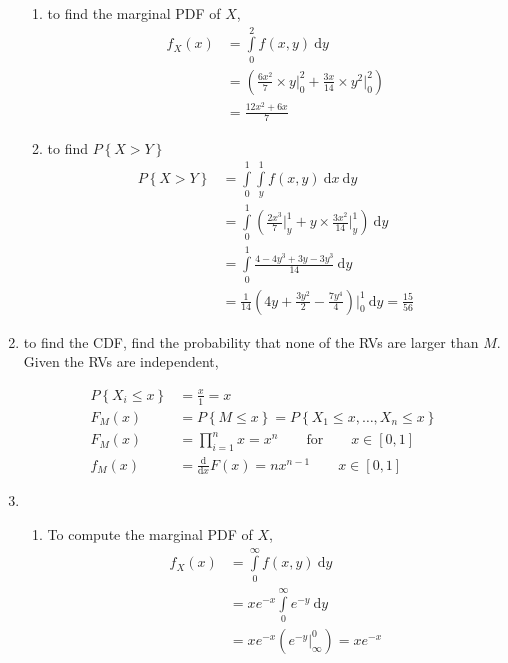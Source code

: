 \begin{enumerate}
\begin{enumerate}
			\item to find the marginal PDF of $ X $,
			\begin{align}
				f_X (x) &= \int\limits_{0}^{2} f(x, y)\ \mathrm{d}y \nonumber \\
				&= \left( \frac{6x^2}{7} \times y \Big|_0^2 + \frac{3x}{14} \times y^2 \Big|_0^2  \right) \nonumber \\
				&= \frac{12x^2 + 6x}{7}
			\end{align}
			
			\item to find $ P \left\{ X > Y \right\} $\\
			
			\begin{align}
				P\left\{ X > Y\right\} &= \int\limits_{0}^{1} \int\limits_{y}^{1} f(x, y)\ \mathrm{d}x \ \mathrm{d}y \nonumber \\
				&= \int\limits_{0}^{1} \left(\frac{2x^3}{7} \Big|_y^1 + y \times \frac{3x^2}{14} \Big|_y^1  \right) \ \mathrm{d}y  \nonumber \\
				&= \int\limits_{0}^{1} \frac{4 - 4y^3 + 3y - 3y^3}{14} \ \mathrm{d}y  \nonumber \\
				&= \frac{1}{14} \left( 4y + \frac{3y^2}{2} - \frac{7y^4}{4} \right)\Big|_0^1 \ \mathrm{d}y  = \frac{15}{56}
			\end{align}
			
		
	\end{enumerate}
	
	\item to find the CDF, find the probability that none of the RVs are larger than $ M $. Given the RVs are independent,
	
	
		\begin{align}
			P\left\{X_i \leq x \right\} &= \frac{x}{1} = x \nonumber \\
			F_M (x) &= P\left\{M \leq x\right\} = P\left\{X_1 \leq x, \dots , X_n \leq x\right\} \nonumber \\
			F_M (x) &= \prod_{i = 1}^{n} x = x^n \qquad \text{for} \qquad x \in \left[0, 1\right] \\
			f_M (x) & = \frac{\mathrm{d}}{\mathrm{d} x} F(x) = nx^{n-1} \qquad x \in \left[0, 1\right]
		\end{align}
	
	
	\item 
		\begin{enumerate}
			\item To compute the marginal PDF of $ X $, 
			\begin{align}
				f_X (x) &= \int\limits_{0}^{\infty} f(x, y)\ \mathrm{d}y \nonumber \\
				&= x e^{-x} \int\limits_{0}^{\infty} e^{-y}\ \mathrm{d}y \nonumber \\
				&= x e^{-x} \left(e^{-y}\Big|_\infty^0\right) = x e^{-x}
			\end{align}
			

\end{enumerate}
\end{enumerate}
